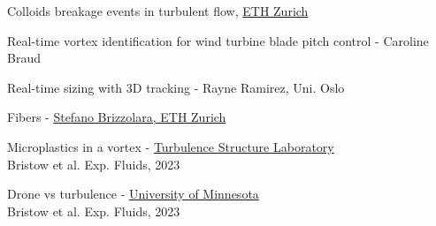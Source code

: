     
\begin{frame}[label=app-3a]{Colloids breakage events in turbulent flow, \href{https://www.dropbox.com/s/8cimpwfsukf11u2/colloids2.mp4?raw=1}{ETH Zurich}}
    \end{frame}
    
    
\begin{frame}[label=app-5]{Real-time vortex identification for wind turbine blade pitch control - Caroline Braud}
    \begin{multicols*}{2}
    \end{multicols*}
\end{frame}
    
\begin{frame}[label=app-6]{Real-time sizing with 3D tracking - Rayne Ramirez, Uni. Oslo}
    \begin{multicols*}{2}
    \end{multicols*}
\end{frame}
    
\begin{frame}[label=app-7]{Fibers - \href{https://www.dropbox.com/s/y5gf55qqeyq5ljr/fibers.mp4?raw=1}{Stefano Brizzolara, ETH Zurich}}
\end{frame}

\begin{frame}[label=app-8a]{Microplastics in a vortex - \href{https://www.dropbox.com/s/in5ewv968dy9j3q/microplastics.mp4?raw=1}{Turbulence Structure Laboratory}}
    \\
    Bristow et al. Exp. Fluids, 2023
\end{frame}
    
\begin{frame}[label=app-8]{Drone vs turbulence - \href{https://www.dropbox.com/s/3lav5rf6s8su6f5/drone.mp4?raw=1}{University of Minnesota}}
    \\
    Bristow et al. Exp. Fluids, 2023
\end{frame}
    
